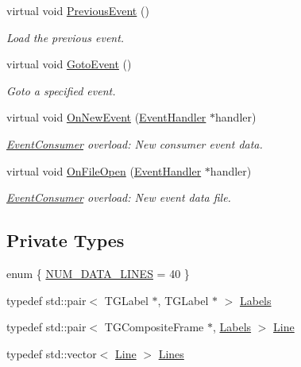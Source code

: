 \begin{DoxyCompactItemize}
virtual void \hyperlink{class_d_d4hep_1_1_event_control_aa313ad37f6a3a7b3d5a26abb37c051d3}{PreviousEvent} ()
\begin{DoxyCompactList}\small\item\em Load the previous event. \item\end{DoxyCompactList}\item 
virtual void \hyperlink{class_d_d4hep_1_1_event_control_a4804b629feb785168b1ddb18592587bb}{GotoEvent} ()
\begin{DoxyCompactList}\small\item\em Goto a specified event. \item\end{DoxyCompactList}\item 
virtual void \hyperlink{class_d_d4hep_1_1_event_control_af3644b3a91372e313440eaca8cf893c2}{OnNewEvent} (\hyperlink{class_d_d4hep_1_1_event_handler}{EventHandler} $\ast$handler)
\begin{DoxyCompactList}\small\item\em \hyperlink{class_d_d4hep_1_1_event_consumer}{EventConsumer} overload: New consumer event data. \item\end{DoxyCompactList}\item 
virtual void \hyperlink{class_d_d4hep_1_1_event_control_a651a44af5e16dd7c9f98e3ccec5971a2}{OnFileOpen} (\hyperlink{class_d_d4hep_1_1_event_handler}{EventHandler} $\ast$handler)
\begin{DoxyCompactList}\small\item\em \hyperlink{class_d_d4hep_1_1_event_consumer}{EventConsumer} overload: New event data file. \item\end{DoxyCompactList}\end{DoxyCompactItemize}
\subsection*{Private Types}
\begin{DoxyCompactItemize}
\item 
enum \{ \hyperlink{class_d_d4hep_1_1_event_control_a9a7c581934b4dff35b3753b630b15f74a0e8834462de33571d882f9225d1ca704}{NUM\_\-DATA\_\-LINES} =  40
 \}
\item 
typedef std::pair$<$ TGLabel $\ast$, TGLabel $\ast$ $>$ \hyperlink{class_d_d4hep_1_1_event_control_a12b653cc77607d8916f8a5ec009036ed}{Labels}
\item 
typedef std::pair$<$ TGCompositeFrame $\ast$, \hyperlink{class_d_d4hep_1_1_event_control_a12b653cc77607d8916f8a5ec009036ed}{Labels} $>$ \hyperlink{class_d_d4hep_1_1_event_control_a8195e2f8755ede7627abeaaacd0155e2}{Line}
\item 
typedef std::vector$<$ \hyperlink{class_d_d4hep_1_1_event_control_a8195e2f8755ede7627abeaaacd0155e2}{Line} $>$ \hyperlink{class_d_d4hep_1_1_event_control_a662fec8b3e1e89af1cf704e41cb7df78}{Lines}
\end{DoxyCompactItemize}
